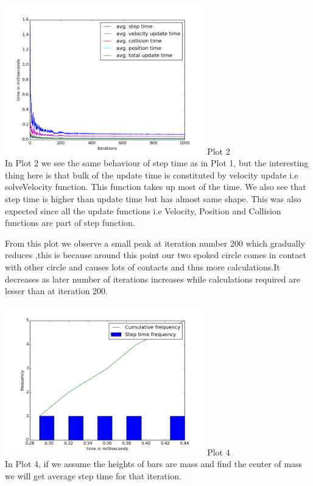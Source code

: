 \documentclass[11pt]{article}
\begin{document}
\includegraphics[width=\textwidth,height = 6.5cm]{../images/g08_plot02.png}
Plot 2
\\
	
In Plot 2 we see the same behaviour of step time as in Plot 1, but the interesting thing here is that bulk of the update time is constituted by velocity update i.e solveVelocity function. This function takes up most of the time. We also see that step time is higher than update time but has almost same shape. This was also expected since all the update functions i.e Velocity, Position and Collision functions are part of step function. 

From this plot we observe a small peak at iteration number 200 which gradually reduces ,this is because around this point our two spoked circle comes in contact with other circle and causes lots of contacts and thus more calculations.It decreases  as later number of iterations increases while calculations required are lesser than at iteration 200.


\includegraphics[width=\textwidth,height = 6.5cm]{../images/g08_plot04.png}
Plot 4
\\

In Plot 4, if we assume the heights of bars are mass and find the center of
mass we will get average step time for that iteration. 
\end{document}
